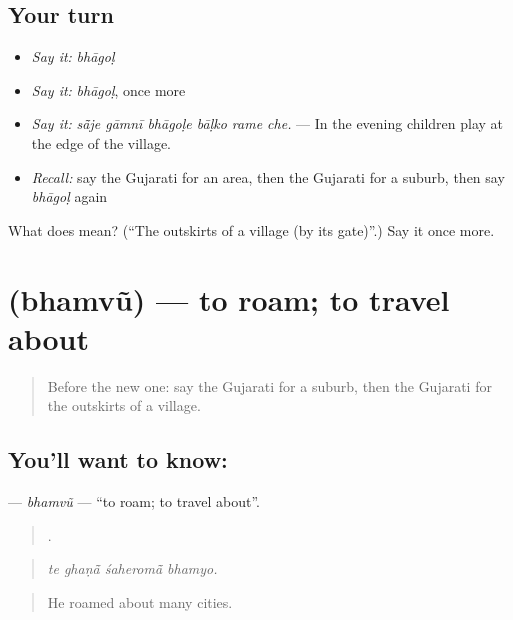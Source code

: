 \subsection*{Your turn}
\begin{itemize}
\raggedright
  \item \emph{Say it:} \emph{bhāgoḷ}
  \item \emph{Say it:} \emph{bhāgoḷ}, once more
  \item \emph{Say it:} \emph{sā̃je gāmnī bhāgoḷe bāḷko rame che.} — In the evening children play at the edge of the village.
  \item \emph{Recall:} say the Gujarati for an area, then the Gujarati for a suburb, then say \emph{bhāgoḷ} again
\end{itemize}

\begin{tcolorbox}[breakable,colback=teal!4,colframe=teal!35!black,title={Before you move on}]
What does  mean? (\textquotedblleft{}The outskirts of a village (by its gate)\textquotedblright{}.) Say it once more.
\end{tcolorbox}
\section[\texorpdfstring{\gu{ભમવું} (bhamvũ)}{ભમવું (bhamvũ)}]{ (bhamvũ) — to roam; to travel about}

\label{lesson:GU-C416-bhamvu}



\begin{quote}
Before the new one: say the Gujarati for a suburb, then the Gujarati for the outskirts of a village.
\end{quote}

\subsection*{You'll want to know: }
\textbf{} — \emph{bhamvũ} — \textquotedblleft{}to roam; to travel about\textquotedblright{}.

\begin{quote}
   .
\end{quote}

\begin{quote}
\emph{te ghaṇā̃ śaheromā̃ bhamyo.}
\end{quote}

\begin{quote}
He roamed about many cities.
\end{quote}

